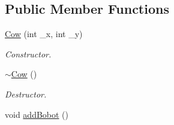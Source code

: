 \subsection*{Public Member Functions}
\begin{DoxyCompactItemize}
\item 
\hyperlink{classCow_a8d004e3d53acceb83ac4321f972fc78b}{Cow} (int \-\_\-x, int \-\_\-y)
\begin{DoxyCompactList}\small\item\em Constructor. \end{DoxyCompactList}\item 
\hypertarget{classCow_ab6e5749431c51b7d1cda263fcd48393a}{\hyperlink{classCow_ab6e5749431c51b7d1cda263fcd48393a}{$\sim$\-Cow} ()}\label{classCow_ab6e5749431c51b7d1cda263fcd48393a}

\begin{DoxyCompactList}\small\item\em Destructor. \end{DoxyCompactList}\item 
\hypertarget{classCow_a33b115281c154d17f259c18fff1f4d3a}{void \hyperlink{classCow_a33b115281c154d17f259c18fff1f4d3a}{add\-Bobot} ()}\label{classCow_a33b115281c154d17f259c18fff1f4d3a}


\end{DoxyCompactItemize}
